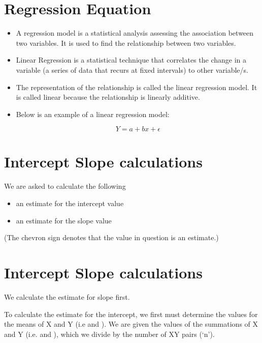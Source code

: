 \documentclass[]{report}
\begin{document}


\section{Regression Equation}
\begin{itemize}
\item A regression model is a statistical analysis assessing the association between two variables. It is used to find the relationship between two variables.
	
\item Linear Regression is a statistical technique that correlates the change in a variable (a series of data that recurs at fixed intervals) to other variable/s. 

\item The representation of the relationship is called the linear regression model. It is called linear because the relationship is linearly additive. 

\item Below is an example of a linear regression model:
	
	\[Y= a + bx + \epsilon\]
\end{itemize}




\section{Intercept Slope calculations}

We are asked to calculate the following
\begin{itemize} 
	\item an estimate for the intercept value
	\item an estimate for the slope value
\end{itemize}
(The chevron sign denotes that the value in question is an estimate.)


\section{Intercept Slope calculations}

We calculate the estimate for slope first.

To calculate the estimate for the intercept, we first must determine the values for the means of X and Y (i.e  and ). We are given the values of the summations of X and Y (i.e. and ), which we divide by the number of XY pairs (‘n’). 
\end{document}
